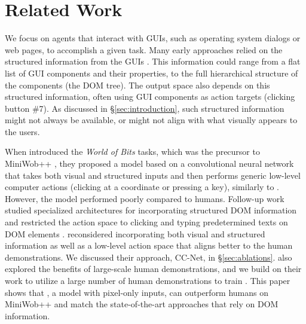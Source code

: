 \section{Related Work}
\label{sec:related-work}

We focus on agents that interact with GUIs, such as operating system dialogs or web pages, to accomplish a given task.
Many early approaches relied on the structured information from the GUIs \citep{zettlemoyer1999visual,allen2007plow,branavan2010reading}. This information could range from a flat list of GUI components and their properties, to the full hierarchical structure of the components (\eg the DOM tree).
The output space also depends on this structured information, often using GUI components as action targets (\eg clicking button \#7). As discussed in \S\ref{sec:introduction}, such structured information might not always be available, or might not align with what visually appears to the users.


When \citet{shi2017world} introduced the \emph{World of Bits} tasks, which was the precursor to MiniWob++ \citep{liu2018reinforcement},
they proposed a model based on a convolutional neural network that takes both visual and structured inputs and then performs generic low-level computer actions (\eg clicking at a coordinate or pressing a key), similarly to \ours.
However, the model performed poorly compared to humans.
Follow-up work studied specialized architectures for incorporating structured DOM information and restricted the action space to clicking and typing predetermined texts on DOM elements \citep{liu2018reinforcement,gur2018learning,jia2019dom}.
\citet{humphreys2022data} reconsidered incorporating both visual and structured information as well as a low-level action space that aligns better to the human demonstrations. We discussed their approach, CC-Net, in \S\ref{sec:ablations}. \citet{humphreys2022data} also explored the benefits of large-scale human demonstrations, and we build on their work to utilize a large number of human demonstrations to train \ours.
This paper shows that \ours, a model with pixel-only inputs, can outperform humans on MiniWob++ and match the state-of-the-art approaches that rely on DOM information.

